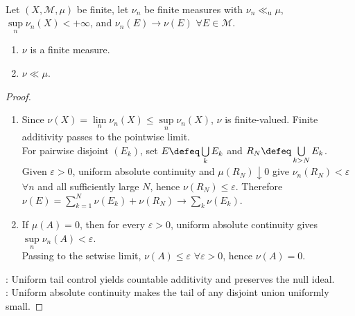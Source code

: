 \begin{theorem} \label{thm:setwise-limit-under-uniform-absolute-continuity} \\
Let $(X,\mathcal{M},\mu)$ be finite, let $\nu_n$ be finite measures with $\nu_n\ll_{\mathrm{u}}\mu$, $\sup\limits_n\nu_n(X)<+\infty$, and $\nu_n(E)\to\nu(E)$ $\forall E\in\mathcal{M}$.
\begin{enumerate}[label=(\roman*)]
\setlength{\itemsep}{0pt}
\item $\nu$ is a finite measure.
\item $\nu\ll\mu$.
\end{enumerate}
\begin{proof}
\begin{enumerate}[label=(\roman*)]
\setlength{\itemsep}{0pt}
\item Since $\nu(X)=\lim\limits_n\nu_n(X)\leq\sup\limits_n\nu_n(X)$, $\nu$ is finite-valued. Finite additivity passes to the pointwise limit.\\
For pairwise disjoint $(E_k)$, set $E\defeq\bigcup\limits_kE_k$ and $R_N\defeq\bigcup\limits_{k>N}E_k$.\\
Given $\varepsilon>0$, uniform absolute continuity and $\mu(R_N)\downarrow0$ give $\nu_n(R_N)<\varepsilon$ $\forall n$ and all sufficiently large $N$, hence $\nu(R_N)\leq\varepsilon$. Therefore $\nu(E)=\sum\limits_{k=1}^N\nu(E_k)+\nu(R_N)\to\sum\limits_k\nu(E_k)$.
\item If $\mu(A)=0$, then for every $\varepsilon>0$, uniform absolute continuity gives $\sup\limits_n\nu_n(A)<\varepsilon$.\\
Passing to the setwise limit, $\nu(A)\leq\varepsilon$ $\forall\varepsilon>0$, hence $\nu(A)=0$.
\end{enumerate}
: Uniform tail control yields countable additivity and preserves the null ideal.\\
: Uniform absolute continuity makes the tail of any disjoint union uniformly small.
\end{proof}
\end{theorem}

